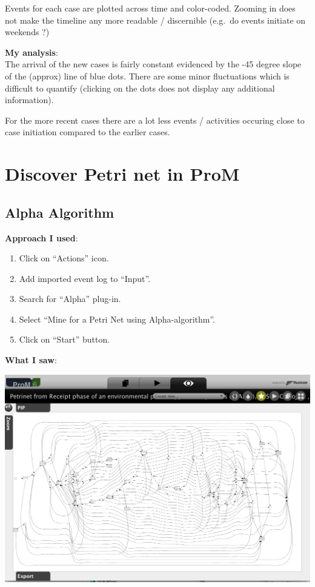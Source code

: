 \documentclass[]{article}
\begin{document}
Events for each case are plotted across time and color-coded. Zooming in
does not make the timeline any more readable / discernible (e.g.~do
events initiate on weekends ?)

\textbf{My analysis}:\\The arrival of the new cases is fairly constant
evidenced by the -45 degree slope of the (approx) line of blue dots.
There are some minor fluctuations which is difficult to quantify
(clicking on the dots does not display any additional information).

For the more recent cases there are a lot less events / activities
occuring close to case initiation compared to the earlier cases.

\section{Discover Petri net in ProM}\label{discover-petri-net-in-prom}

\subsection{Alpha Algorithm}\label{alpha-algorithm}

\textbf{Approach I used}:

\begin{enumerate}
\def\labelenumi{\arabic{enumi}.}
\itemsep1pt\parskip0pt
\item
  Click on ``Actions'' icon.
\item
  Add imported event log to ``Input''.
\item
  Search for ``Alpha'' plug-in.
\item
  Select ``Mine for a Petri Net using Alpha-algorithm''.
\item
  Click on ``Start'' button.
\end{enumerate}

\textbf{What I saw}:

\includegraphics{CoSeLoG_Step_05.png}
\end{document}
